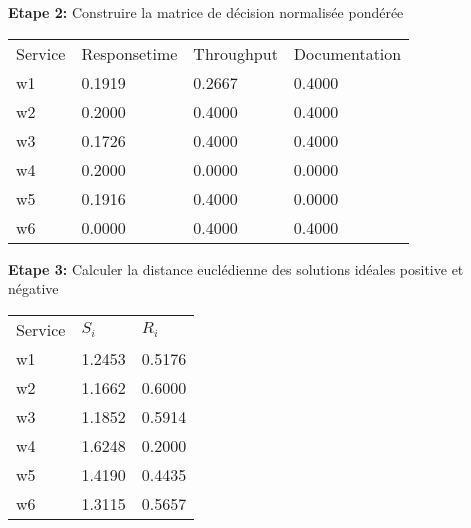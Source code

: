 \documentclass[french, 11pt, a4paper, oldfontcommands]{report}
\begin{document}
	\textbf{Etape 2:} Construire la matrice de décision normalisée pondérée
\begin{table}[ht]
	\begin{tabular}{llll}
	\rowcolor[HTML]{9B9B9B} 
	Service & Responsetime & Throughput & Documentation \\
	w1      & 0.1919       & 0.2667     & 0.4000        \\
	\rowcolor[HTML]{EFEFEF} 
	w2      & 0.2000       & 0.4000     & 0.4000        \\
	w3      & 0.1726       & 0.4000     & 0.4000        \\
	\rowcolor[HTML]{EFEFEF} 
	w4      & 0.2000       & 0.0000     & 0.0000        \\
	w5      & 0.1916       & 0.4000     & 0.0000        \\
	\rowcolor[HTML]{EFEFEF} 
	w6      & 0.0000       & 0.4000     & 0.4000       
	\end{tabular}
	\end{table}

	\textbf{Etape 3:} Calculer la distance euclédienne des solutions idéales positive et négative
\begin{table}[ht]
	\begin{tabular}{lll}
	\rowcolor[HTML]{9B9B9B} 
	Service & $S_i$  & $R_i$  \\
	w1      & 1.2453 & 0.5176 \\
	\rowcolor[HTML]{EFEFEF} 
	w2      & 1.1662 & 0.6000 \\
	w3      & 1.1852 & 0.5914 \\
	\rowcolor[HTML]{EFEFEF} 
	w4      & 1.6248 & 0.2000 \\
	w5      & 1.4190 & 0.4435 \\
	\rowcolor[HTML]{EFEFEF} 
	w6      & 1.3115 & 0.5657
	\end{tabular}
	\end{table}
\end{document}
